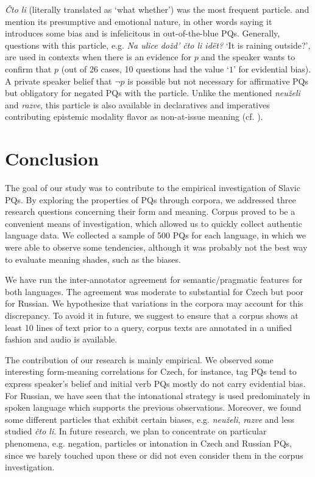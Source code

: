 \documentclass[output=paper,colorlinks,citecolor=brown]{langscibook}
\begin{document}
\textit{Čto li} (literally translated as `what whether') was the most frequent particle. \citet{Restan1969} and \citet{Dobrovolskij2014} mention its presumptive and emotional nature, in other words saying it introduces some bias and is infelicitous in out-of-the-blue PQs. Generally, questions with this particle, e.g. \textit{Na ulice dožd' čto li idët?} `It is raining outside?', are used in contexts when there is an evidence for $p$ and the speaker wants to confirm that $p$ (out of 26 cases, 10 questions had the value `$1$' for evidential bias). A private speaker belief that $\neg p$ is possible but not necessary for affirmative PQs but obligatory for negated PQs with the particle. Unlike the mentioned \textit{neuželi} and \textit{razve}, this particle is also available in declaratives and imperatives contributing epistemic modality flavor as non-at-issue meaning (cf. \citealt{Bernasconi2023}). 


\section{Conclusion} \label{sec-conclusion}

The goal of our study was to contribute to the empirical investigation of Slavic PQs. By exploring the properties of PQs through corpora, we addressed three research questions concerning their form and meaning. Corpus proved to be a convenient means of investigation, which allowed us to quickly collect authentic language data. We collected a sample of 500 PQs for each language, in which we were able to observe some tendencies, although it was probably not the best way to evaluate meaning shades, such as the biases. 

We have run the inter-annotator agreement for semantic/pragmatic features for both languages. The agreement was moderate to substantial for Czech but poor for Russian. We hypothesize that variations in the corpora may account for this discrepancy. To avoid it in future, we suggest to ensure that a corpus shows at least 10 lines of text prior to a query, corpus texts are annotated in a unified fashion and audio is available.  

The contribution of our research is mainly empirical. We observed some interesting form-meaning correlations for Czech, for instance, tag PQs tend to express speaker's belief and initial verb PQs mostly do not carry evidential bias. For Russian, we have seen that the intonational strategy is used predominately in spoken language which supports the previous observations. Moreover, we found some different particles that exhibit certain biases, e.g. \textit{neuželi}, \textit{razve} and less studied \textit{čto li}. In future research, we plan to concentrate on particular phenomena, e.g. negation, particles or intonation in Czech and Russian PQs, since we barely touched upon these or did not even consider them in the corpus investigation.
\end{document}
